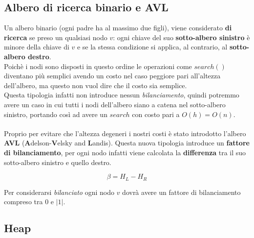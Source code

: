 \documentclass{article}
\begin{document}
\subsection*{Albero di ricerca binario e AVL}
Un albero binario (ogni padre ha al massimo due figli), viene considerato \textbf{di ricerca} se
preso un qualsiasi nodo $v$:
ogni chiave del suo \textbf{sotto-albero sinistro} è minore della chiave di $v$ e se la stessa 
condizione si applica, al contrario, al \textbf{sotto-albero destro}. \\
Poichè i nodi sono disposti in questo ordine le operazioni come $search()$ diventano più semplici
avendo un costo nel caso peggiore pari all'altezza dell'albero, ma questo non vuol dire che il costo
sia semplice. \\
Questa tipologia infatti non introduce nessun \textit{bilanciamento}, quindi potremmo avere un caso
in cui tutti i nodi dell'albero siano a catena nel sotto-albero sinistro, portando così ad avere
un $search$ con costo pari a $O(h) = O(n)$.
\\
\\
Proprio per evitare che l'altezza degeneri i nostri costi è stato introdotto l'albero \textbf{AVL} 
(\textbf{A}delson-\textbf{V}elsky and \textbf{L}andis). Questa nuova tipologia introduce un 
\textbf{fattore di bilanciamento}, per ogni nodo infatti viene calcolata la 
\textbf{differenza} tra il suo sotto-albero sinistro e quello destro. 

\[ \beta = H_L - H_R\]

Per considerarsi \textit{bilanciato} ogni nodo $v$ dovrà avere un fattore di bilanciamento 
compreso tra $0$ e $|1|$.

\subsection*{Heap}
\end{document}
